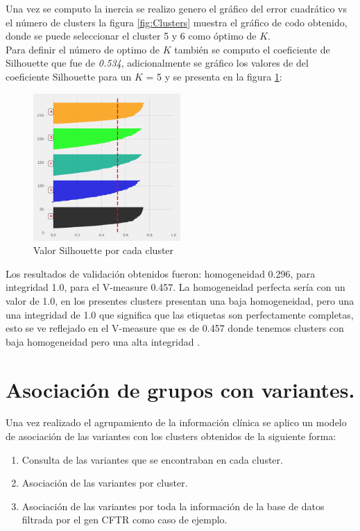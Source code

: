 Una vez se computo la inercia se realizo genero el gráfico del error cuadrático vs el número de clusters  la figura \ref{fig:Clusters} muestra el gráfico de codo obtenido, donde se puede seleccionar el cluster 5 y 6 como óptimo de $K$.\\

Para definir el número de optimo de $K$ también se computo el coeficiente de Silhouette  que fue de \textit{0.534}, adicionalmente se gráfico los valores de del coeficiente Silhouette para un $K$ = 5 y se presenta en la figura \ref{fig:S}:

\begin{figure}[H] 
	\centering
	\includegraphics[width=0.5\textwidth]{Kap4/S}
	\caption{Valor Silhouette por cada cluster} 
	\label{fig:S}
\end{figure}

Los resultados de validación obtenidos fueron: homogeneidad 0.296, para integridad 1.0, para el V-measure 0.457. La homogeneidad perfecta sería con un valor de 1.0, en los presentes clusters presentan una baja homogeneidad, pero una una integridad de 1.0 que significa que las etiquetas son perfectamente completas, esto se ve reflejado en el V-measure que es de 0.457 donde tenemos clusters con baja homogeneidad pero una alta integridad \cite{scikit-learn}. 

\section{Asociación de grupos con variantes.}

Una vez realizado el agrupamiento de la información clínica se aplico un modelo de asociación de las variantes con los clusters obtenidos de la siguiente forma:

\begin{enumerate}
	\item Consulta de las variantes que se encontraban en cada cluster.
	\item Asociación de las variantes por cluster.
	\item Asociación de las variantes por toda la información de la base de datos filtrada por el gen CFTR como caso de ejemplo.
\end{enumerate}



